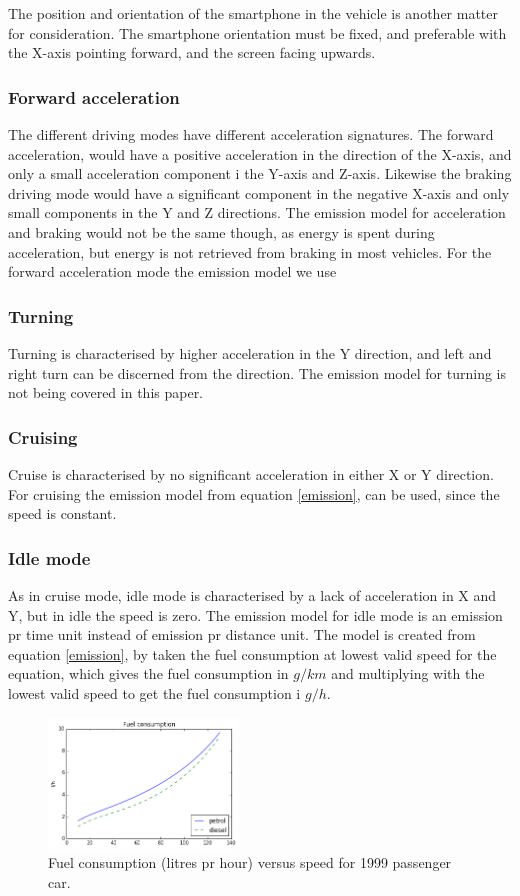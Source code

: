 The position and orientation of the smartphone in the vehicle is another matter for consideration. The smartphone orientation must be fixed, and preferable with the X-axis pointing forward, and the screen facing upwards.

\subsubsection{Forward acceleration}
The different driving modes have different acceleration signatures. The forward acceleration, would have a positive acceleration in the direction of the X-axis, and only a small acceleration component i the Y-axis and Z-axis. Likewise the braking driving mode would have a significant component in the negative X-axis and only small components in the Y and Z directions. The emission model for acceleration and braking would not be the same though, as energy is spent during acceleration, but energy is not retrieved from braking in most vehicles. For the forward acceleration mode the emission model we use 

\subsubsection{Turning}
Turning is characterised by higher acceleration in the Y direction, and left and right turn can be discerned from the direction. The emission model for turning is not being covered in this paper.

\subsubsection{Cruising}
Cruise is characterised by no significant acceleration in either X or Y direction. For cruising the emission model from equation \ref{emission}, can be used, since the speed is constant.

\subsubsection{Idle mode}
As in cruise mode, idle mode is characterised by a lack of acceleration in X and Y, but in idle the speed is zero. The emission model for idle mode is an emission pr time unit instead of emission pr distance unit. The model is created from equation \ref{emission}, by taken the fuel consumption at lowest valid speed for the equation, which gives the fuel consumption in $g/km$ and multiplying with the lowest valid speed to get the fuel consumption i $g/h$.
\begin{figure}[h]
	\centering
  \includegraphics[width=0.45\textwidth]{fc_liter_pr_hour}
  \caption{Fuel consumption  (litres pr hour) versus speed for 1999 passenger car.}
  \label{FC}
\end{figure}

